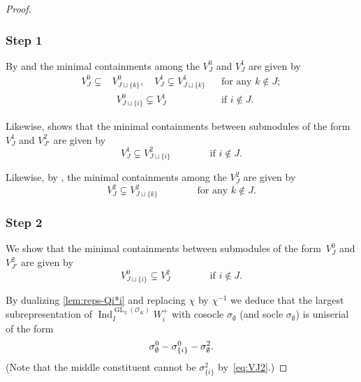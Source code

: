 \documentclass[JEP,XML,SOM,Unicode,NoFloatCountersInSection, NoEqCountersInSection,published]{cedram}
\newcommand{\cO}{\mathcal{O}}
\DeclareMathOperator{\GL}{GL}
\DeclareMathOperator{\Ind}{Ind}
\theoremstyle{plain}
\theoremstyle{definition}
\begin{document}
\begin{proof}
\subsubsection*{Step 1}
By \cite[Th.\,2.4]{BP} and \cite[Lem.\,3.7]{HuWang2} the minimal containments among the $V_J^0$ and $V_J^1$ are given by
\begin{align}
V_J^0 \subsetneq &V^0_{J\sqcup\{k\}},\quad V_J^1 \subsetneq V^1_{J\sqcup\{k\}} && \text{for any $k \notin J$}; \label{eq:VJ0,VJ1} \\
&\ \ V_{J \sqcup \{i\}}^0 \subsetneq V^1_{J} && \text{if $i \notin J$}. \label{eq:VJ0-VJ1}
\end{align}

Likewise, \cite[Lem.\,3.8]{HuWang2} shows that the minimal containments between submodules of the form $V_J^1$ and $V_{J'}^2$ are given by
\begin{equation}
V_{J}^1 \subsetneq V^2_{J \sqcup \{i\}} \qquad\qquad \text{if $i \notin J$}.\label{eq:VJ1-VJ2}
\end{equation}

Likewise, by \cite[Th.\,2.4]{BP}, the minimal containments among the $V_J^2$ are given by
\begin{equation}
V_J^2 \subsetneq V^2_{J\sqcup\{k\}} \qquad\qquad \text{for any $k \notin J$}.\label{eq:VJ2}
\end{equation}

\subsubsection*{Step 2}
We show that
the minimal containments between submodules of the form~$V_J^0$ and $V_{J'}^2$ are given by
\begin{equation}
V_{J \sqcup \{i\}}^0 \subsetneq V^2_{J} \qquad\qquad \text{if $i \notin J$}.\label{eq:VJ0-VJ2}
\end{equation}

By dualizing \eqref{lem:reps-Qi*i} and replacing $\chi$ by $\chi^{-1}$ we deduce that the largest subrepresentation of $\Ind_I^{\GL_2(\cO_K)} W_i^+$ with cosocle $\sigma_\emptyset$ (and socle $\sigma_\emptyset$) is uniserial of the form
\begin{equation}
\sigma_\emptyset^0 \-- \sigma_{\{i\}}^0 \-- \sigma_\emptyset^2.\label{eq:sigma-empty-002}
\end{equation}
(Note that the middle constituent cannot be $\sigma_{\{i\}}^2$ by~\eqref{eq:VJ2}.)


\end{proof}
\end{document}
